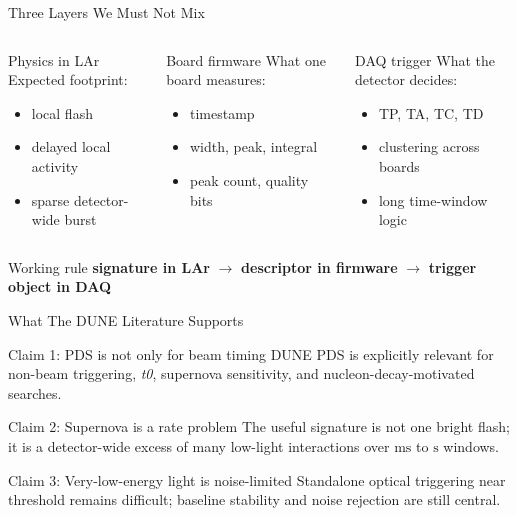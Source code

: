\documentclass[aspectratio=169]{beamer}
\begin{document}
\begin{frame}{Three Layers We Must Not Mix}
\small
\begin{columns}[T,onlytextwidth]
\begin{block}{Physics in LAr}
Expected footprint:
\begin{itemize}
  \item local flash
  \item delayed local activity
  \item sparse detector-wide burst
\end{itemize}
\end{block}

\begin{block}{Board firmware}
What one board measures:
\begin{itemize}
  \item timestamp
  \item width, peak, integral
  \item peak count, quality bits
\end{itemize}
\end{block}

\begin{block}{DAQ trigger}
What the detector decides:
\begin{itemize}
  \item TP, TA, TC, TD
  \item clustering across boards
  \item long time-window logic
\end{itemize}
\end{block}
\end{columns}

\vspace{1mm}
\begin{alertblock}{Working rule}
\centering
\textbf{signature in LAr} \(\rightarrow\) \textbf{descriptor in firmware} \(\rightarrow\) \textbf{trigger object in DAQ}
\end{alertblock}
\end{frame}

\begin{frame}{What The DUNE Literature Supports}
\small
\begin{block}{Claim 1: PDS is not only for beam timing}
DUNE PDS is explicitly relevant for non-beam triggering, \textit{t0}, supernova sensitivity, and nucleon-decay-motivated searches.
\end{block}

\begin{block}{Claim 2: Supernova is a rate problem}
The useful signature is not one bright flash; it is a detector-wide excess of many low-light interactions over \(\mathrm{ms}\) to \(\mathrm{s}\) windows.
\end{block}

\begin{block}{Claim 3: Very-low-energy light is noise-limited}
Standalone optical triggering near threshold remains difficult; baseline stability and noise rejection are still central.
\end{block}
\end{frame}
\end{document}
